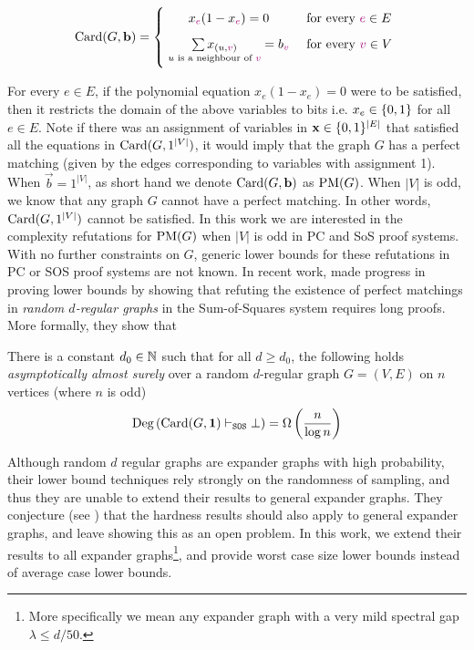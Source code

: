 \documentclass[11pt]{article}
\begin{document}
\[
        \Card{G, \vec{b}}=
        \Bigger[10]\{\begin{array}{@{}cl}
                x_{\highlight{e}}(1 - x_{\highlight{e}}) = 0 & \text{ for every $\highlight{e} \in E$}\\[3mm]
                \underset{u \text{ is a neighbour of }\highlight{v}}{\sum x_{(u,\highlight{v})}}= b_{\highlight{v}} & \text{ for every $\highlight{v} \in V$} \\[3mm]
        \end{array}
\]

For every $e \in E$, if the polynomial equation $x_e(1 - x_e) = 0$ were to be satisfied, then it restricts the domain of the above variables to bits i.e. $x_e \in \{0,1\}$ for all $e \in E$.
Note if there was an assignment of variables in $\mathbf{x} \in \{0,1\}^{|E|}$ that satisfied all the equations in $\text{Card}(G, 1^{|V|})$, it would imply that the graph $G$ has a perfect matching (given by the edges corresponding to variables with assignment 1).  
When $\vec{b} = 1^{|V|}$, as short hand we denote $\text{Card}(G, \mathbf{b})$ as $\text{PM}(G)$.
When $|V|$ is odd, we know that any graph $G$ cannot have a perfect matching.
In other words, $\text{Card}(G, 1^{|V|})$ cannot be satisfied.
In this work we are interested in the complexity refutations for $\text{PM}(G)$  when $|V|$ is odd in PC and SoS proof systems.
With no further constraints on $G$, generic lower bounds for these refutations in PC or SOS proof systems are not known.
In recent work, \citet{Austrin_2022} made progress in proving lower bounds by showing that refuting the existence of perfect matchings in \emph{random $d$-regular graphs} in the Sum-of-Squares system requires long proofs.
More formally, they show that 

\begin{theorem}\label{thm:prev-thm}
There is a constant $d_0 \in \mathbb{N}$ such that for all $d \geq d_0$, the following holds \emph{asymptotically almost surely} over a random $d$-regular graph $G=(V,E)$ on $n$ vertices (where $n$ is odd) \[ \text{Deg}\left(\text{Card}(G, \mathbf{1}) \vdash_{\texttt{SOS}} \bot\right) = \Omega\left(\frac{n}{\log n}\right)\]
\end{theorem}

Although random $d$ regular graphs are expander graphs with high probability, their lower bound techniques rely strongly on the randomness of sampling, and thus they are unable to extend their results to general expander graphs.
They conjecture (see \citep[Section 6]{Austrin_2022}) that the hardness results should also apply to general expander graphs, and leave showing this as an open problem. In this work, we extend their results to all expander graphs\footnote{More specifically we mean any expander graph with a very mild spectral gap $\lambda \leq d/50$.}, and provide worst case size lower bounds instead of average case lower bounds.
\end{document}
